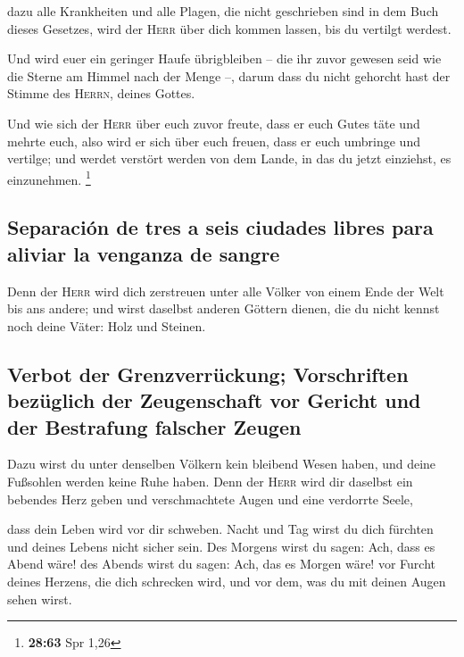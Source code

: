  dazu alle Krankheiten und alle Plagen, die nicht
geschrieben sind in dem Buch dieses Gesetzes, wird der \textsc{Herr}
über dich kommen lassen, bis du vertilgt werdest.

 Und wird euer ein geringer Haufe übrigbleiben -- die ihr
zuvor gewesen seid wie die Sterne am Himmel nach der Menge --, darum
dass du nicht gehorcht hast der Stimme des \textsc{Herrn}, deines
Gottes.

 Und wie sich der \textsc{Herr} über euch zuvor freute,
dass er euch Gutes täte und mehrte euch, also wird er sich über euch
freuen, dass er euch umbringe und vertilge; und werdet verstört werden
von dem Lande, in das du jetzt einziehst, es einzunehmen. \footnote{\textbf{28:63}
  Spr 1,26}

\hypertarget{separaciuxf3n-de-tres-a-seis-ciudades-libres-para-aliviar-la-venganza-de-sangre}{%
\subsection{Separación de tres a seis ciudades libres para aliviar la
venganza de
sangre}\label{separaciuxf3n-de-tres-a-seis-ciudades-libres-para-aliviar-la-venganza-de-sangre}}

 Denn der \textsc{Herr} wird dich zerstreuen unter alle
Völker von einem Ende der Welt bis ans andere; und wirst daselbst
anderen Göttern dienen, die du nicht kennst noch deine Väter: Holz und
Steinen.

\hypertarget{verbot-der-grenzverruxfcckung-vorschriften-bezuxfcglich-der-zeugenschaft-vor-gericht-und-der-bestrafung-falscher-zeugen}{%
\subsection{Verbot der Grenzverrückung; Vorschriften bezüglich der
Zeugenschaft vor Gericht und der Bestrafung falscher
Zeugen}\label{verbot-der-grenzverruxfcckung-vorschriften-bezuxfcglich-der-zeugenschaft-vor-gericht-und-der-bestrafung-falscher-zeugen}}

 Dazu wirst du unter denselben Völkern kein bleibend
Wesen haben, und deine Fußsohlen werden keine Ruhe haben. Denn der
\textsc{Herr} wird dir daselbst ein bebendes Herz geben und
verschmachtete Augen und eine verdorrte Seele,

 dass dein Leben wird vor dir schweben. Nacht und Tag
wirst du dich fürchten und deines Lebens nicht sicher sein.
 Des Morgens wirst du sagen: Ach, dass es Abend wäre! des
Abends wirst du sagen: Ach, das es Morgen wäre! vor Furcht deines
Herzens, die dich schrecken wird, und vor dem, was du mit deinen Augen
sehen wirst.

